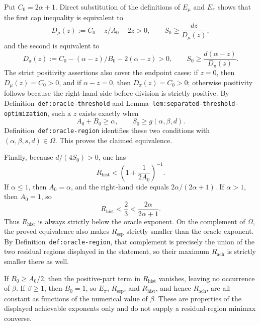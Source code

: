 Put \(C_0=2\alpha+1\). Direct substitution of the definitions of \(E_\mu\) and \(E_\pi\) shows that the first cap inequality is equivalent to
\[
D_\mu(z):=C_0-z/A_0-2z>0,
\qquad
S_0\ge\frac{dz}{D_\mu(z)},
\]
and the second is equivalent to
\[
D_\pi(z):=C_0-(\alpha-z)/B_0-2(\alpha-z)>0,
\qquad
S_0\ge\frac{d(\alpha-z)}{D_\pi(z)}.
\]
The strict positivity assertions also cover the endpoint cases: if \(z=0\), then \(D_\mu(z)=C_0>0\), and if \(\alpha-z=0\), then \(D_\pi(z)=C_0>0\); otherwise positivity follows because the right-hand side before division is strictly positive. By Definition~\texttt{def:oracle-threshold} and Lemma~\texttt{lem:separated-threshold-optimization}, such a \(z\) exists exactly when
\[
A_0+B_0\ge\alpha,
\qquad S_0\ge g(\alpha,\beta,d).
\]
Definition~\texttt{def:oracle-region} identifies these two conditions with \((\alpha,\beta,s,d)\in\Omega\). This proves the claimed equivalence.

Finally, because \(d/(4S_0)>0\), one has
\[
R_{\mathrm{hist}}<\left(1+\frac1{2A_0}\right)^{-1}.
\]
If \(\alpha\le1\), then \(A_0=\alpha\), and the right-hand side equals \(2\alpha/(2\alpha+1)\). If \(\alpha>1\), then \(A_0=1\), so
\[
R_{\mathrm{hist}}<\frac23<\frac{2\alpha}{2\alpha+1}.
\]
Thus \(R_{\mathrm{hist}}\) is always strictly below the oracle exponent. On the complement of \(\Omega\), the proved equivalence also makes \(R_{\mathrm{sep}}\) strictly smaller than the oracle exponent. By Definition~\texttt{def:oracle-region}, that complement is precisely the union of the two residual regions displayed in the statement, so their maximum \(R_{\mathrm{ach}}\) is strictly smaller there as well.

If \(B_0\ge A_0/2\), then the positive-part term in \(R_{\mathrm{hist}}\) vanishes, leaving no occurrence of \(\beta\). If \(\beta\ge1\), then \(B_0=1\), so \(E_\pi\), \(R_{\mathrm{sep}}\), and \(R_{\mathrm{hist}}\), and hence \(R_{\mathrm{ach}}\), are all constant as functions of the numerical value of \(\beta\). These are properties of the displayed achievable exponents only and do not supply a residual-region minimax converse.